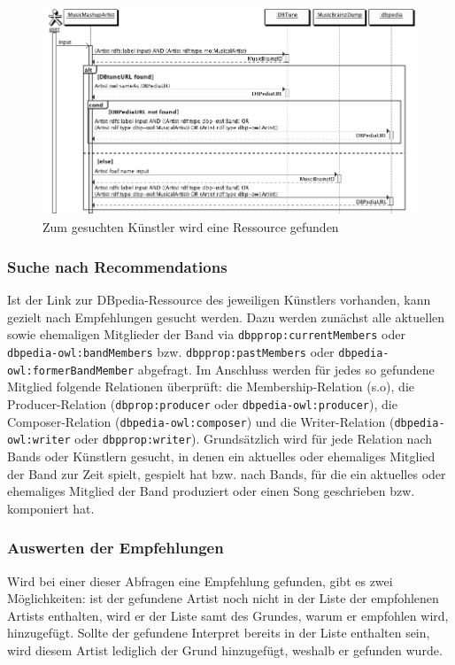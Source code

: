 \begin{figure}[ht!]
\centering
\includegraphics[width=137mm]{bilder/sequenzdiagramm.png}
\caption{Zum gesuchten Künstler wird eine Ressource gefunden \label{overflow}}
\end{figure}


\subsubsection{Suche nach Recommendations}
Ist der Link zur DBpedia-Ressource des jeweiligen Künstlers vorhanden, kann gezielt nach Empfehlungen gesucht werden. Dazu werden zunächst alle aktuellen sowie ehemaligen Mitglieder der Band via \texttt{dbpprop:currentMembers} oder \texttt{dbpedia-owl:bandMembers}  bzw. \texttt{dbpprop:pastMembers} oder \texttt{dbpedia-owl:formerBandMember} abgefragt. Im Anschluss werden für jedes so gefundene Mitglied folgende Relationen überprüft: die Membership-Relation (s.o), die Producer-Relation (\texttt{dbprop:producer} oder \texttt{dbpedia-owl:producer}), die Composer-Relation (\texttt{dbpedia-owl:composer}) und die Writer-Relation (\texttt{dbpedia-owl:writer} oder \texttt{dbpprop:writer}). Grundsätzlich wird für jede Relation nach Bands oder Künstlern gesucht, in denen ein aktuelles oder ehemaliges Mitglied der Band zur Zeit spielt, gespielt hat bzw. nach Bands, für die ein aktuelles oder ehemaliges Mitglied der Band produziert oder einen Song geschrieben bzw. komponiert hat. 

\subsubsection{Auswerten der Empfehlungen}
Wird bei einer dieser Abfragen eine Empfehlung gefunden, gibt es zwei Möglichkeiten: ist der gefundene Artist noch nicht in der Liste der empfohlenen Artists enthalten, wird er der Liste samt des Grundes, warum er empfohlen wird, hinzugefügt. Sollte der gefundene Interpret bereits in der Liste enthalten sein, wird diesem Artist lediglich der Grund hinzugefügt, weshalb er gefunden wurde.  %


